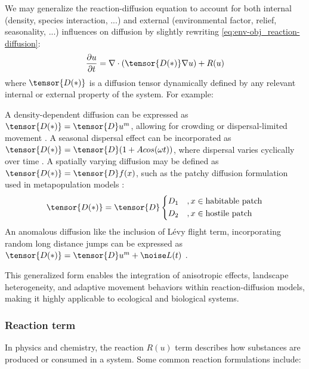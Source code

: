 We may generalize the reaction-diffusion equation to account for both internal (density, species interaction, ...) and external (environmental factor, relief, seasonality, ...) influences on diffusion by slightly rewriting \cref{eq:env-obj_reaction-diffusion}:
\begin{align}
    \frac{\partial u}{\partial t} = \nabla \cdot (\tensor{D(*)} \nabla u) + R(u)
\end{align}
where $\tensor{D(*)}$  is a diffusion tensor dynamically defined by any relevant internal or external property of the system. For example:
\begin{Itemize}
    \Item{} A density-dependent diffusion can be expressed as $\tensor{D(*)} = \tensor{D} u^m$, allowing for crowding or dispersal-limited movement \cite{Zhu2023}.
    \Item{} A seasonal dispersal effect can be incorporated as $\tensor{D(*)} = \tensor{D} (1 + A cos(\omega t) )$, where dispersal varies cyclically over time \cite{Katriel2021}.
    \Item{} A spatially varying diffusion may be defined as $\tensor{D(*)} = \tensor{D} f(x)$, such as the patchy diffusion formulation used in metapopulation models \cite{Czaran1998}:
    \begin{align}
        \tensor{D(*)} = \tensor{D} \begin{dcases}
            D_1&, x \in \text{habitable patch} \\
            D_2&, x \in \text{hostile patch}
        \end{dcases}
    \end{align}
    \Item{} An anomalous diffusion like the inclusion of Lévy flight term, incorporating random long distance jumps can be expressed as $\tensor{D(*)} = \tensor{D} u^m + \noise L(t)$ \cite{Humphries2014,Chechkin2008}.
\end{Itemize}

This generalized form enables the integration of anisotropic effects, landscape heterogeneity, and adaptive movement behaviors within reaction-diffusion models, making it highly applicable to ecological and biological systems.

\subsubsection{Reaction term}
In physics and chemistry, the reaction $R(u)$ term describes how substances are produced or consumed in a system. Some common reaction formulations include:


